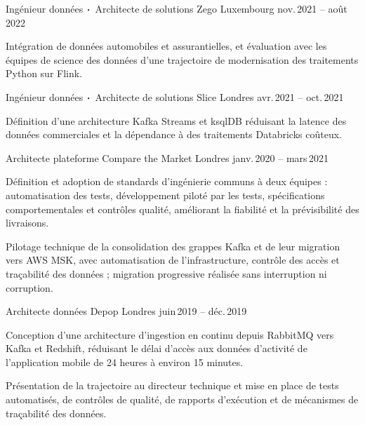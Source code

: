 \begin{cventries}

    \cventry
    {Ingénieur données$\sqbig$Architecte de solutions}
    {Zego}
    {Luxembourg}
    {nov.\,2021 -- août\,2022}
    {
        \begin{cvitems}
            \item {Intégration de données automobiles et assurantielles, et évaluation avec les équipes de science des données d’une trajectoire de modernisation des traitements Python sur Flink.}
        \end{cvitems}
    }
%

    \cventry
    {Ingénieur données$\sqbig$Architecte de solutions}
    {Slice}
    {Londres}
    {avr.\,2021 -- oct.\,2021}
    {
        \begin{cvitems}
            \item {Définition d’une architecture Kafka Streams et ksqlDB réduisant la latence des données commerciales et la dépendance à des traitements Databricks coûteux.}
        \end{cvitems}
    }

    \cventry
    {Architecte plateforme}
    {Compare the Market}
    {Londres}
    {janv.\,2020 -- mars\,2021}
    {
        \begin{cvitems}
            \item {Définition et adoption de standards d’ingénierie communs à deux équipes : automatisation des tests, développement piloté par les tests, spécifications comportementales et contrôles qualité, améliorant la fiabilité et la prévisibilité des livraisons.}
            \item {Pilotage technique de la consolidation des grappes Kafka et de leur migration vers AWS MSK, avec automatisation de l’infrastructure, contrôle des accès et traçabilité des données ; migration progressive réalisée sans interruption ni corruption.}
        \end{cvitems}
    }

    \cventry
    {Architecte données}
    {Depop}
    {Londres}
    {juin\,2019 -- déc.\,2019}
    {
        \begin{cvitems}
            \item {Conception d’une architecture d’ingestion en continu depuis RabbitMQ vers Kafka et Redshift, réduisant le délai d’accès aux données d’activité de l’application mobile de 24 heures à environ 15 minutes.}
            \item {Présentation de la trajectoire au directeur technique et mise en place de tests automatisés, de contrôles de qualité, de rapports d’exécution et de mécanismes de traçabilité des données.}
        \end{cvitems}
    }


\end{cventries}
